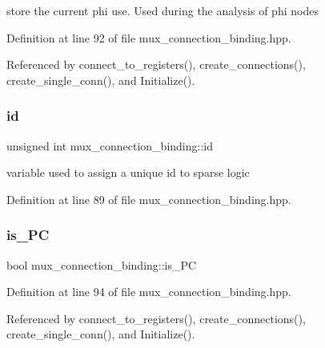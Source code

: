 store the current phi use. Used during the analysis of phi nodes 



Definition at line 92 of file mux\+\_\+connection\+\_\+binding.\+hpp.



Referenced by connect\+\_\+to\+\_\+registers(), create\+\_\+connections(), create\+\_\+single\+\_\+conn(), and Initialize().

\mbox{\label{classmux__connection__binding_a29d2b0e043edf53408192cdb8f770b19}} 
\subsubsection{\texorpdfstring{id}{id}}
{\footnotesize\ttfamily unsigned int mux\+\_\+connection\+\_\+binding\+::id\hspace{0.3cm}{\ttfamily [private]}}



variable used to assign a unique id to sparse logic 



Definition at line 89 of file mux\+\_\+connection\+\_\+binding.\+hpp.

\mbox{\label{classmux__connection__binding_a1e2a12ebf8b4526a747c73d91d97adc9}} 
\subsubsection{\texorpdfstring{is\+\_\+\+PC}{is\_PC}}
{\footnotesize\ttfamily bool mux\+\_\+connection\+\_\+binding\+::is\+\_\+\+PC\hspace{0.3cm}{\ttfamily [private]}}



Definition at line 94 of file mux\+\_\+connection\+\_\+binding.\+hpp.



Referenced by connect\+\_\+to\+\_\+registers(), create\+\_\+connections(), create\+\_\+single\+\_\+conn(), and Initialize().

